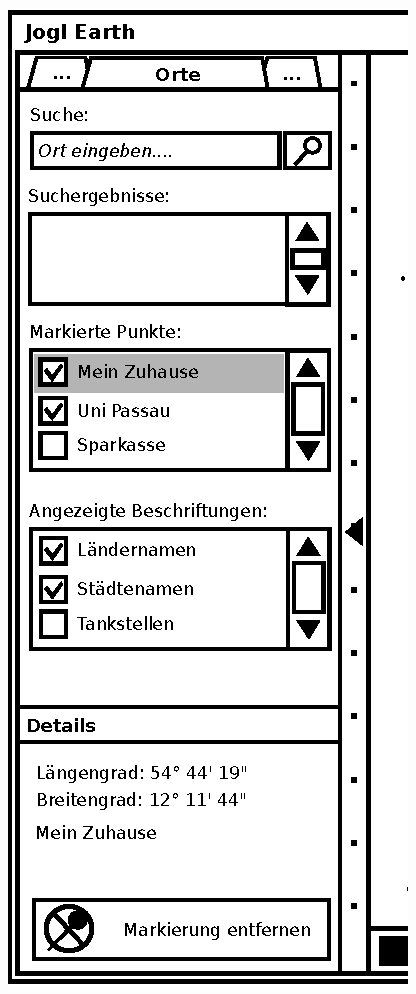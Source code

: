 \documentclass[10pt]{scrreprt}
\begin{document}
\begin{figure}
	\centering
	\begin{minipage}[c]{6cm}
	\centering
		\includegraphics[scale=0.9]{GUI-Orte.eps}
	\end{minipage}
	\begin{minipage}[c]{6cm}
	\centering

\end{minipage}
\end{figure}
\end{document}
